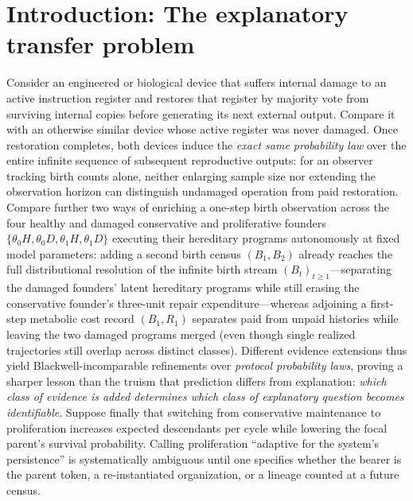 \documentclass[11pt,a4paper]{article}
\begin{document}
\section{Introduction: The explanatory transfer
problem}\label{introduction-the-explanatory-transfer-problem}

Consider an engineered or biological device that suffers internal damage
to an active instruction register and restores that register by majority
vote from surviving internal copies before generating its next external
output. Compare it with an otherwise similar device whose active
register was never damaged. Once restoration completes, both devices
induce the \emph{exact same probability law} over the entire infinite
sequence of subsequent reproductive outputs: for an observer tracking
birth counts alone, neither enlarging sample size nor extending the
observation horizon can distinguish undamaged operation from paid
restoration. Compare further two ways of enriching a one-step birth
observation across the four healthy and damaged conservative and
proliferative founders
\(\{\theta_0 H, \theta_0 D, \theta_1 H, \theta_1 D\}\) executing their
hereditary programs autonomously at fixed model parameters: adding a
second birth census \((B_1, B_2)\) already reaches the full
distributional resolution of the infinite birth stream
\((B_t)_{t \ge 1}\)---separating the damaged founders' latent hereditary
programs while still erasing the conservative founder's three-unit
repair expenditure---whereas adjoining a first-step metabolic cost
record \((B_1, R_1)\) separates paid from unpaid histories while leaving
the two damaged programs merged (even though single realized
trajectories still overlap across distinct classes). Different evidence
extensions thus yield Blackwell-incomparable refinements over
\emph{protocol probability laws}, proving a sharper lesson than the
truism that prediction differs from explanation: \emph{which class of
evidence is added determines which class of explanatory question becomes
identifiable}. Suppose finally that switching from conservative
maintenance to proliferation increases expected descendants per cycle
while lowering the focal parent's survival probability. Calling
proliferation ``adaptive for the system's persistence'' is
systematically ambiguous until one specifies whether the bearer is the
parent token, a re-instantiated organization, or a lineage counted at a
future census.
\end{document}
